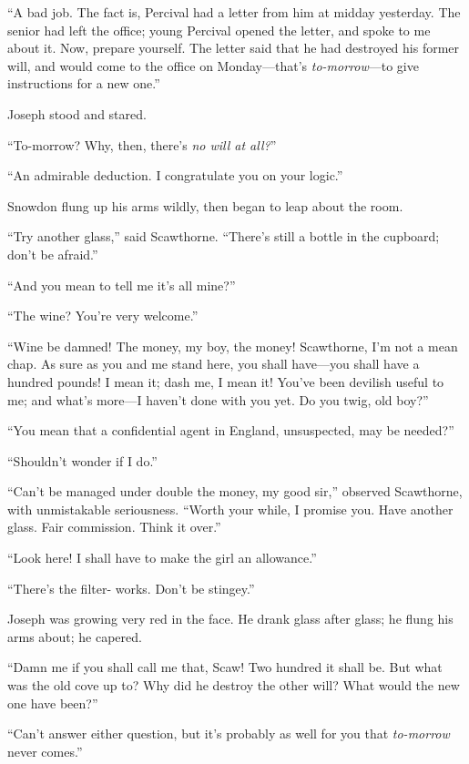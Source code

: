 ``A bad job. The fact is, Percival had a letter from him at midday
yesterday. The senior had left the office; young Percival opened the
letter, and spoke to me about it. Now, prepare yourself. The letter said
that he had destroyed his former will, and would come to the office on
Monday---that's \emph{to-morrow}---to give instructions for a new one.''

Joseph stood and stared.

``To-morrow? Why, then, there's \emph{no will at all?}''

``An admirable deduction. I congratulate you on your logic.''

Snowdon flung up his arms wildly, then began to leap about the room.

``Try another glass,'' said Scawthorne. ``There's still a bottle in the
cupboard; don't be afraid.''

``And you mean to tell me it's all mine?''

``The wine? You're very welcome.''

{\protect\hypertarget{175}{}{}}``Wine be damned! The money, my boy, the
money! Scawthorne, I'm not a mean chap. As sure as you and me stand
here, you shall have---you shall have a hundred pounds! I mean it; dash
me, I mean it! You've been devilish useful to me; and what's more---I
haven't done with you yet. Do you twig, old boy?''

``You mean that a confidential agent in England, unsuspected, may be
needed?''

``Shouldn't wonder if I do.''

``Can't be managed under double the money, my good sir,'' observed
Scawthorne, with unmistakable seriousness. ``Worth your while, I promise
you. Have another glass. Fair commission. Think it over.''

``Look here! I shall have to make the girl an allowance.''

``There's the filter- works. Don't be stingey.''

Joseph was growing very red in the face. He drank glass after glass; he
flung his arms about; he capered.

``Damn me if you shall call me that, Scaw! Two hundred it shall be. But
what was the old cove up to? Why did he destroy the other will? What
would the new one have been?''

{\protect\hypertarget{176}{}{}}``Can't answer either question, but it's
probably as well for you that \emph{to-morrow} never comes.''

